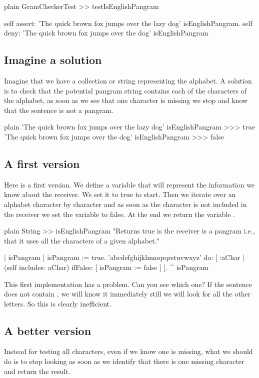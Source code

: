 \documentclass[10pt,twoside,english]{_support/latex/sbabook/sbabook}
\begin{document}
\begin{displaycode}{plain}
GramCheckerTest >> testIsEnglishPangram

	self assert: 'The quick brown fox jumps over the lazy dog' isEnglishPangram.
	self deny: 'The quick brown fox jumps over the  dog' isEnglishPangram
\end{displaycode}
\subsection{Imagine a solution}
Imagine that we have a collection or string representing the alphabet.
A solution is to check that the potential pangram string contains each of the characters of the alphabet, as soon as we see that one character is missing we stop and know that the sentence is not a pangram. 

\begin{displaycode}{plain}
'The quick brown fox jumps over the lazy dog' isEnglishPangram
>>> true
'The quick brown fox jumps over the dog' isEnglishPangram
>>> false
\end{displaycode}
\subsection{A first version}
Here is a first version. We define a variable  that will represent the information we know about the receiver. We set it to true to start. Then we iterate over an alphabet character by character and as soon as the character is not included in the receiver we set the variable to false. 
At the end we return the variable .  

\begin{displaycode}{plain}
String >> isEnglishPangram
	"Returns true is the receiver is a pangram i.e., that it uses all the characters of a given alphabet."
	
	| isPangram |
	isPangram := true. 
	'abcdefghijklmnopqrstuvwxyz' do: [ :aChar |
		(self includes: aChar)
			ifFalse: [ isPangram := false ]
		].
	^ isPangram
\end{displaycode}

This first implementation has a problem. Can you see which one? 
If the sentence does not contain , we will know it immediately still we will look for all the other letters. So this is clearly inefficient.
\subsection{A better version}
Instead for testing all characters, even if we know one is missing, what we should do is to stop looking as soon as we identify that there is one missing character and return the result. 
\end{document}
